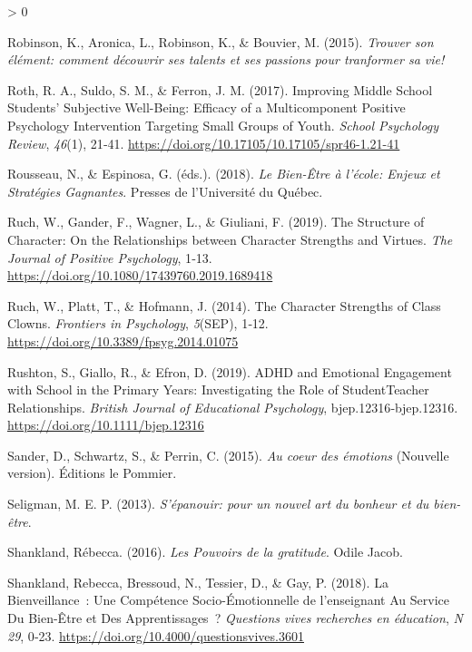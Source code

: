 \documentclass[
  french,
]{article}
\newlength{\cslhangindent}
\newenvironment{CSLReferences}[2] %
 {%
  \setlength{\parindent}{0pt}
  \ifodd #1 \everypar{\setlength{\hangindent}{\cslhangindent}}\ignorespaces\fi
  \ifnum #2 > 0
  \setlength{\parskip}{#2\baselineskip}
  \fi
 }%
 {}
\begin{document}
\begin{CSLReferences}{1}{0}
\leavevmode\hypertarget{ref-robinson2015}{}%
Robinson, K., Aronica, L., Robinson, K., \& Bouvier, M. (2015). \emph{{Trouver son élément: comment découvrir ses talents et ses passions pour tranformer sa vie!}}

\leavevmode\hypertarget{ref-roth2017}{}%
Roth, R. A., Suldo, S. M., \& Ferron, J. M. (2017). Improving {Middle School Students}' {Subjective Well}-{Being}: {Efficacy} of a {Multicomponent Positive Psychology Intervention Targeting Small Groups} of {Youth}. \emph{School Psychology Review}, \emph{46}(1), 21‑41. \url{https://doi.org/10.17105/10.17105/spr46-1.21-41}

\leavevmode\hypertarget{ref-rousseau2018}{}%
Rousseau, N., \& Espinosa, G. (éds.). (2018). \emph{Le Bien-Être à l'école: Enjeux et Stratégies Gagnantes}. {Presses de l'Université du Québec}.

\leavevmode\hypertarget{ref-ruch2019a}{}%
Ruch, W., Gander, F., Wagner, L., \& Giuliani, F. (2019). The Structure of Character: {On} the Relationships between Character Strengths and Virtues. \emph{The Journal of Positive Psychology}, 1‑13. \url{https://doi.org/10.1080/17439760.2019.1689418}

\leavevmode\hypertarget{ref-ruch2014}{}%
Ruch, W., Platt, T., \& Hofmann, J. (2014). The Character Strengths of Class Clowns. \emph{Frontiers in Psychology}, \emph{5}(SEP), 1‑12. \url{https://doi.org/10.3389/fpsyg.2014.01075}

\leavevmode\hypertarget{ref-rushton2019}{}%
Rushton, S., Giallo, R., \& Efron, D. (2019). {ADHD} and Emotional Engagement with School in the Primary Years: {Investigating} the Role of Student{}Teacher Relationships. \emph{British Journal of Educational Psychology}, bjep.12316‑bjep.12316. \url{https://doi.org/10.1111/bjep.12316}

\leavevmode\hypertarget{ref-sander2015}{}%
Sander, D., Schwartz, S., \& Perrin, C. (2015). \emph{{Au coeur des émotions}} (Nouvelle version). {Éditions le Pommier}.

\leavevmode\hypertarget{ref-seligman2013a}{}%
Seligman, M. E. P. (2013). \emph{{S'épanouir: pour un nouvel art du bonheur et du bien-être}}.

\leavevmode\hypertarget{ref-shankland2016a}{}%
Shankland, Rébecca. (2016). \emph{{Les Pouvoirs de la gratitude}}. {Odile Jacob}.

\leavevmode\hypertarget{ref-shankland2018a}{}%
Shankland, Rebecca, Bressoud, N., Tessier, D., \& Gay, P. (2018). La Bienveillance~: Une Compétence Socio-Émotionnelle de l'enseignant Au Service Du Bien-Être et Des Apprentissages~? \emph{Questions vives recherches en éducation}, \emph{N{} 29}, 0‑23. \url{https://doi.org/10.4000/questionsvives.3601}


\end{CSLReferences}
\end{document}

